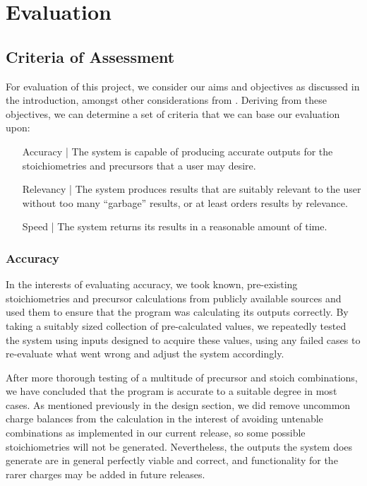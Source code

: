 \chapter{Evaluation}
\label{ch:evaluation}
\section{Criteria of Assessment}
For evaluation of this project, we consider our aims and objectives as discussed in the introduction, amongst other considerations from . Deriving from these objectives, we can determine a set of criteria that we can base our evaluation upon:

\begin{enumerate}[label = {}, leftmargin=\widthof{Relevancy |}+\labelsep]
    \item[Accuracy |] The system is capable of producing accurate outputs for the stoichiometries and precursors that a user may desire.
    
    \item[Relevancy |] The system produces results that are suitably relevant to the user without too many “garbage” results, or at least orders results by relevance.

\item[Speed |] The system returns its results in a reasonable amount of time.
\end{enumerate}

\subsection{Accuracy}
In the interests of evaluating accuracy, we took known, pre-existing stoichiometries and precursor calculations from publicly available sources and used them to ensure that the program was calculating its outputs correctly. By taking a suitably sized collection of pre-calculated values, we repeatedly tested the system using inputs designed to acquire these values, using any failed cases to re-evaluate what went wrong and adjust the system accordingly. 

After more thorough testing of a multitude of precursor and stoich combinations, we have concluded that the program is accurate to a suitable degree in most cases. As mentioned previously in the design section, we did remove uncommon charge balances from the calculation in the interest of avoiding untenable combinations as implemented in our current release, so some possible stoichiometries will not be generated. Nevertheless, the outputs the system does generate are in general perfectly viable and correct, and functionality for the rarer charges may be added in future releases.

